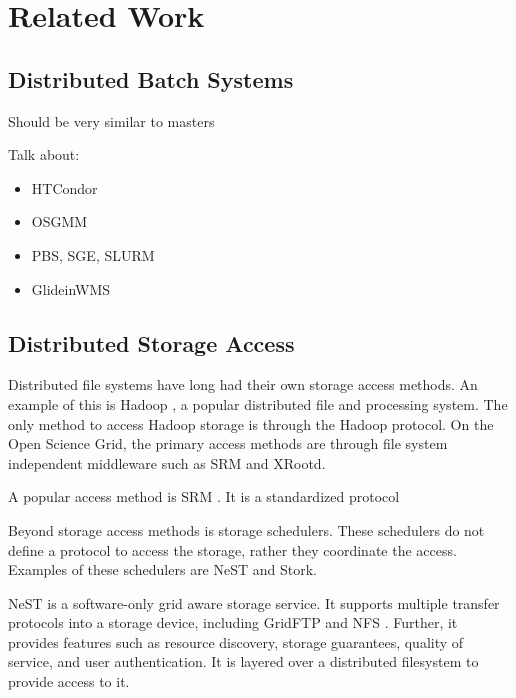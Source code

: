 \chapter{Related Work}
\label{chapter:relatedwork}

\section{Distributed Batch Systems}

Should be very similar to masters

Talk about:
\begin{itemize}
\item HTCondor
\item OSGMM
\item PBS, SGE, SLURM
\item GlideinWMS
\end{itemize}

\section{Distributed Storage Access}

Distributed file systems have long had their own storage access methods.  An example of this is Hadoop \cite{white2012hadoop}, a popular distributed file and processing system.  The only method to access Hadoop storage is through the Hadoop protocol.  On the Open Science Grid, the primary access methods are through file system independent middleware such as SRM and XRootd. 


A popular access method is SRM \cite{shoshani2002storage}.  It is a standardized protocol 

Beyond storage access methods is storage schedulers.  These schedulers do not define a protocol to access the storage, rather they coordinate the access.  Examples of these schedulers are NeST and Stork.

NeST \cite{bent2002flexibility} is a software-only grid aware storage service.  It supports multiple transfer protocols into a storage device, including GridFTP \cite{allcock2005globus} and NFS \cite{walsh1985overview}.  Further, it provides features such as resource discovery, storage guarantees, quality of service, and user authentication.  It is layered over a distributed filesystem to provide access to it.

